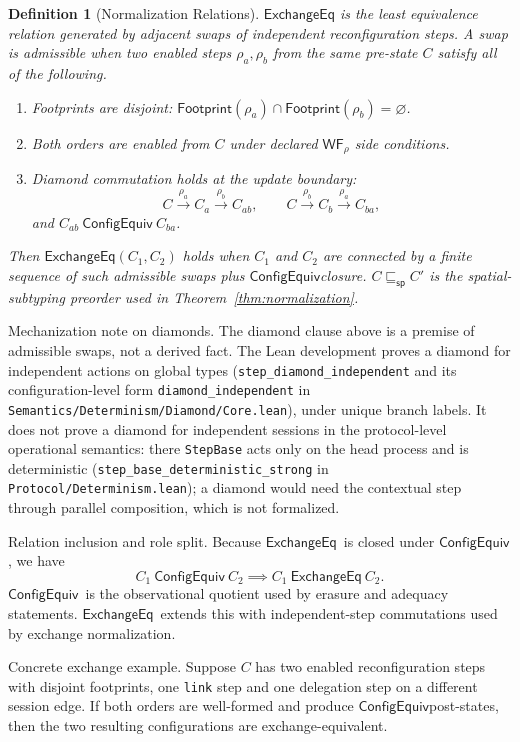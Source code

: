 \documentclass[a4paper,10pt,twocolumn,english]{article}
\numberwithin{equation}{section}
\theoremstyle{paperdef}
\newtheorem{definition}{Definition}[section]
\theoremstyle{paperplain}
\theoremstyle{paperdef}
\theoremstyle{paperremark}
\theoremstyle{paperdef}
\newcommand{\ConfigEquiv}{\ensuremath{\mathsf{ConfigEquiv}}}
\newcommand{\ExchangeEq}{\ensuremath{\mathsf{ExchangeEq}}}
\begin{document}
\begin{definition}[Normalization Relations]
	$\ExchangeEq$ is the least equivalence relation generated by adjacent swaps of independent reconfiguration steps. A swap is admissible when two enabled steps $\rho_a,\rho_b$ from the same pre-state $C$ satisfy all of the following.
	\begin{enumerate}
		\item Footprints are disjoint:
		      $\mathsf{Footprint}(\rho_a)\cap\mathsf{Footprint}(\rho_b)=\varnothing$.
		\item Both orders are enabled from $C$ under declared $\mathsf{WF}_\rho$ side conditions.
		\item Diamond commutation holds at the update boundary:
		      \[
			      C \xrightarrow{\rho_a} C_a \xrightarrow{\rho_b} C_{ab},
			      \qquad
			      C \xrightarrow{\rho_b} C_b \xrightarrow{\rho_a} C_{ba},
		      \]
		      and $C_{ab}\ \ConfigEquiv\ C_{ba}$.
	\end{enumerate}
	Then $\ExchangeEq(C_1,C_2)$ holds when $C_1$ and $C_2$ are connected by a finite sequence of such admissible swaps plus \ConfigEquiv closure.
	$C \sqsubseteq_{\mathsf{sp}} C'$ is the spatial-subtyping preorder used in Theorem~\ref{thm:normalization}.
\end{definition}

Mechanization note on diamonds. The diamond clause above is a premise of
admissible swaps, not a derived fact. The Lean development proves a diamond for
independent actions on global types (\nolinkurl{step_diamond_independent} and its
configuration-level form \nolinkurl{diamond_independent} in
\texttt{Semantics/\allowbreak Determinism/\allowbreak Diamond/\allowbreak Core.lean}), under unique
branch labels. It does not prove a diamond for independent sessions in the
protocol-level operational semantics: there \texttt{StepBase} acts only on the
head process and is deterministic (\nolinkurl{step_base_deterministic_strong} in
\texttt{Protocol/\allowbreak Determinism.lean}); a diamond would need the contextual
step through parallel composition, which is not formalized.

Relation inclusion and role split. Because \ExchangeEq\ is closed under
\ConfigEquiv, we have
\[
	C_1\ \ConfigEquiv\ C_2 \implies C_1\ \ExchangeEq\ C_2.
\]
\ConfigEquiv\ is the observational quotient used by erasure and adequacy
statements. \ExchangeEq\ extends this with independent-step commutations used by
exchange normalization.

Concrete exchange example. Suppose $C$ has two enabled reconfiguration steps with disjoint footprints, one \texttt{link} step and one delegation step on a different session edge. If both orders are well-formed and produce \ConfigEquiv post-states, then the two resulting configurations are exchange-equivalent.
\end{document}

